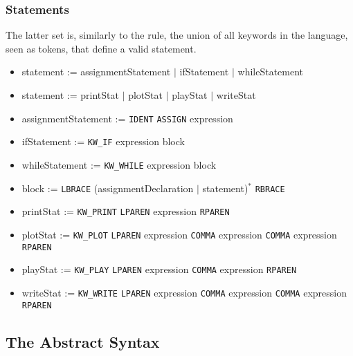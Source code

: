 \subsubsection{Statements}

The latter set is, similarly to the  rule, the union of all keywords in the language, seen as tokens, that define a valid statement.

\begin{itemize}
	\item statement := assignmentStatement $|$ ifStatement $|$ whileStatement
	\item statement := printStat $|$ plotStat $|$ playStat $|$ writeStat
	\item assignmentStatement := \texttt{IDENT} \texttt{ASSIGN} expression
	\item ifStatement := \texttt{KW\_IF} expression block
	\item whileStatement := \texttt{KW\_WHILE} expression block
	\item block := \texttt{LBRACE} (assignmentDeclaration $|$ statement)$^*$ \texttt{RBRACE}
	\item printStat := \texttt{KW\_PRINT} \texttt{LPAREN} expression \texttt{RPAREN}
	\item plotStat := \texttt{KW\_PLOT} \texttt{LPAREN} expression \texttt{COMMA} expression \texttt{COMMA} expression \texttt{RPAREN}
	\item playStat := \texttt{KW\_PLAY} \texttt{LPAREN} expression \texttt{COMMA} expression \texttt{RPAREN}
	\item writeStat := \texttt{KW\_WRITE} \texttt{LPAREN} expression \texttt{COMMA} expression \texttt{COMMA} expression \texttt{RPAREN}
\end{itemize}

\subsection{The Abstract Syntax}

